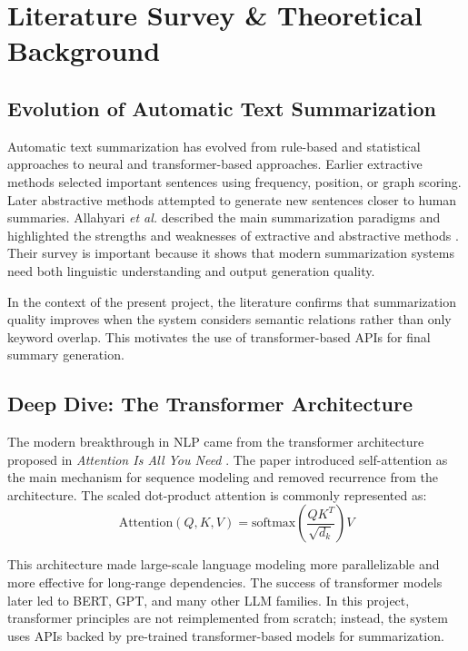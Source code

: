 \documentclass[12pt, a4paper]{report}
\begin{document}
\chapter{Literature Survey \& Theoretical Background}
\section{Evolution of Automatic Text Summarization}
Automatic text summarization has evolved from rule-based and statistical approaches to neural and transformer-based approaches. Earlier extractive methods selected important sentences using frequency, position, or graph scoring. Later abstractive methods attempted to generate new sentences closer to human summaries. Allahyari \textit{et al.} described the main summarization paradigms and highlighted the strengths and weaknesses of extractive and abstractive methods \cite{textsumsurvey}. Their survey is important because it shows that modern summarization systems need both linguistic understanding and output generation quality.

In the context of the present project, the literature confirms that summarization quality improves when the system considers semantic relations rather than only keyword overlap. This motivates the use of transformer-based APIs for final summary generation.

\section{Deep Dive: The Transformer Architecture}
The modern breakthrough in NLP came from the transformer architecture proposed in \textit{Attention Is All You Need} \cite{vaswani}. The paper introduced self-attention as the main mechanism for sequence modeling and removed recurrence from the architecture. The scaled dot-product attention is commonly represented as:
\begin{equation}
  \text{Attention}(Q,K,V)=\text{softmax}\left(\frac{QK^T}{\sqrt{d_k}}\right)V
\end{equation}

This architecture made large-scale language modeling more parallelizable and more effective for long-range dependencies. The success of transformer models later led to BERT, GPT, and many other LLM families. In this project, transformer principles are not reimplemented from scratch; instead, the system uses APIs backed by pre-trained transformer-based models for summarization.
\end{document}
